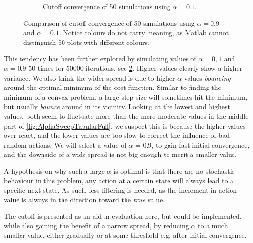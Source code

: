 \begin{figure}
\begin{subfigure}{.5\textwidth}
		\caption{Cutoff convergence of 50 simulations using $\alpha = 0.1$.}
		\label{fig:50plot01}
	\end{subfigure}
	\caption{Comparison of cutoff convergence of 50 simulations using $\alpha = 0.9$ and $\alpha = 0.1$. Notice colours do not carry meaning, as Matlab cannot distinguish 50 plots with different colours.}
	\label{fig:50plot}
\end{figure}

This tendency has been further explored by simulating values of $\alpha = 0,1$ and $\alpha = 0.9$ 50 times for 50000 iterations, see \cref{fig:50plot}. Higher values clearly show a higher variance. We also think the wider spread is due to higher $\alpha$ values \textit{bouncing} around the optimal minimum of the cost function. Similar to finding the minimum of a convex problem, a large step size will sometimes hit the minimum, but usually \textit{bounce} around in its vicinity.
Looking at the lowest and highest values, both seem to fluctuate more than the more moderate values in the middle part of \cref{fig:AlphaSweepTabularFull}, we suspect this is because the higher values over react, and the lower values are too slow to correct the influence of bad random actions.
We will select a value of $\alpha$ = 0.9, to gain fast initial convergence, and the downside of a wide spread is not big enough to merit a smaller value. 

A hypothesis on why such a large $\alpha$ is optimal is that there are no stochastic behaviour in this problem, any action at a certain state will always lead to a specific next state. As such, less filtering is needed, as the increment in action value is always in the direction toward the \textit{true} value.

The cutoff is presented as an aid in evaluation here, but could be implemented, while also gaining the benefit of a narrow spread, by reducing $\alpha$ to a much smaller value, either gradually or at some threshold e.g. after initial convergence.

\newpage \clearpage

